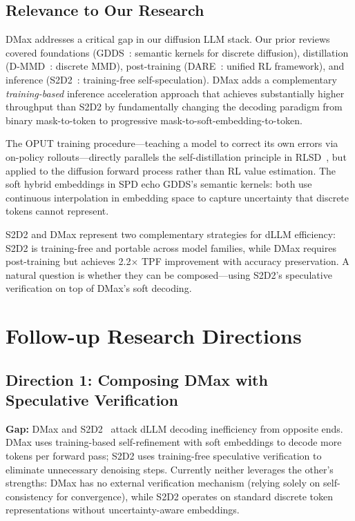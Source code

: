 \documentclass[11pt]{article}
\begin{document}
\subsection{Relevance to Our Research}

DMax addresses a critical gap in our diffusion LLM stack. Our prior reviews covered foundations (GDDS~\cite{gdds}: semantic kernels for discrete diffusion), distillation (D-MMD~\cite{dmmd}: discrete MMD), post-training (DARE~\cite{dare}: unified RL framework), and inference (S2D2~\cite{s2d2}: training-free self-speculation). DMax adds a complementary \textit{training-based} inference acceleration approach that achieves substantially higher throughput than S2D2 by fundamentally changing the decoding paradigm from binary mask-to-token to progressive mask-to-soft-embedding-to-token.

The OPUT training procedure---teaching a model to correct its own errors via on-policy rollouts---directly parallels the self-distillation principle in RLSD~\cite{rlsd}, but applied to the diffusion forward process rather than RL value estimation. The soft hybrid embeddings in SPD echo GDDS's semantic kernels: both use continuous interpolation in embedding space to capture uncertainty that discrete tokens cannot represent.

S2D2 and DMax represent two complementary strategies for dLLM efficiency: S2D2 is training-free and portable across model families, while DMax requires post-training but achieves 2.2$\times$ TPF improvement with accuracy preservation. A natural question is whether they can be composed---using S2D2's speculative verification on top of DMax's soft decoding.

\section{Follow-up Research Directions}

\subsection{Direction 1: Composing DMax with Speculative Verification}

\textbf{Gap:} DMax and S2D2~\cite{s2d2} attack dLLM decoding inefficiency from opposite ends. DMax uses training-based self-refinement with soft embeddings to decode more tokens per forward pass; S2D2 uses training-free speculative verification to eliminate unnecessary denoising steps. Currently neither leverages the other's strengths: DMax has no external verification mechanism (relying solely on self-consistency for convergence), while S2D2 operates on standard discrete token representations without uncertainty-aware embeddings.
\end{document}
